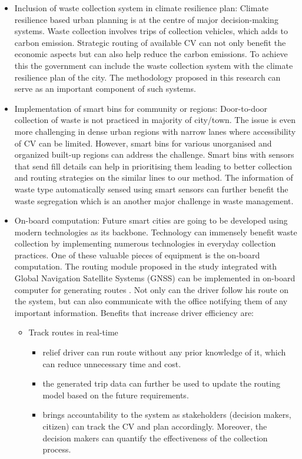 \documentclass[12pt]{article}
\begin{document}
\begin{itemize}
\item Inclusion of waste collection system in climate resilience plan: Climate resilience based urban planning is at the centre of major decision-making systems. Waste collection involves trips of collection vehicles, which adds to carbon emission. Strategic routing of available CV can not only benefit the economic aspects but can also help reduce the carbon emissions. To achieve this the government can include the waste collection system with the climate resilience plan of the city. The methodology proposed in this research can serve as an important component of such systems.
    
\item Implementation of smart bins for community or regions:  Door-to-door collection of waste is not practiced in majority of city/town. The issue is even more challenging in dense urban regions with narrow lanes where accessibility of CV can be limited. However, smart bins for various unorganised and organized built-up regions can address the challenge. Smart bins with sensors that send fill details can help in prioritising them leading to better collection and routing strategies on the similar lines to our method. The information of waste type automatically sensed using smart sensors can further benefit the waste segregation which is an another major challenge in waste management.\cite{actionplan}

 \item On-board computation: Future smart cities are going to be developed using modern technologies as its backbone. Technology can immensely benefit waste collection by implementing  numerous technologies in everyday collection practices. One of these valuable pieces of equipment is the on-board computation. The routing module proposed in the study integrated with Global Navigation Satellite Systems (GNSS) can be implemented in on-board computer for generating routes . Not only can the driver follow his route on the system, but can also communicate with the office notifying them of any important information. Benefits that increase driver efficiency are:
 \begin{itemize}
 \item Track routes in real-time
   \begin{itemize}
 \item relief driver can run route without any prior knowledge of it,  which can reduce unnecessary time and cost.\item the generated trip data can further be used to update the routing model based on the future requirements.
   \item brings accountability to the system as stakeholders (decision makers, citizen) can track the CV and plan accordingly. Moreover, the decision makers can quantify the effectiveness of the collection process. 
    

\end{itemize}
\end{itemize}
\end{itemize}
\end{document}
